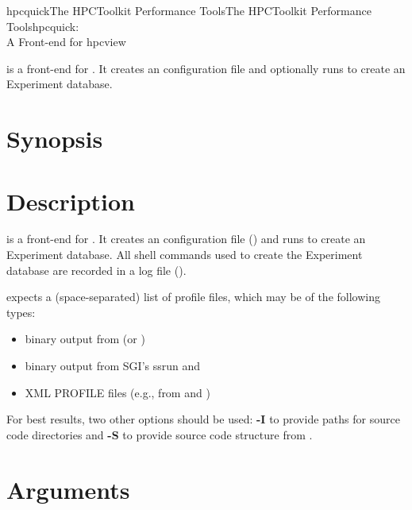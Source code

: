 \documentclass[english]{article}
\begin{document}
\begin{Name}{1}{hpcquick}{The HPCToolkit Performance Tools}{The HPCToolkit Performance Tools}{hpcquick:\\ A Front-end for hpcview}

 is a front-end for .
It creates an  configuration file and optionally runs  to create an Experiment database.

\end{Name}

\section{Synopsis}

 

\section{Description}

 is a front-end for .
It creates an  configuration file () and runs  to create an Experiment database.
All shell commands used to create the Experiment database are recorded in a log file ().

 expects a (space-separated) list of profile files, which may be of the following types:
\begin{itemize}
  \item binary output from  (or )
  \item binary output from SGI's ssrun and 
  \item XML PROFILE files (e.g., from  and )
\end{itemize}
For best results, two other options should be used: \textbf{-I} to provide paths for source code directories and \textbf{-S} to provide source code structure from .

\section{Arguments}
\end{document}
